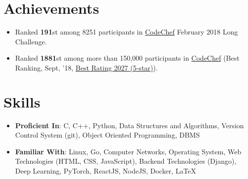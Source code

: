 \documentclass[a4paper,11pt]{article}
\newcommand{\resumeSubHeadingListStart}{\begin{itemize}[leftmargin=*, topsep=0pt]}
\newcommand{\resumeSubHeadingListEnd}{\end{itemize}}
\newcommand{\resumeItemListStart}{\begin{itemize}}
\newcommand{\resumeItemListEnd}{\end{itemize}\vspace{-5pt}}
\begin{document}
\section{Achievements}
    \resumeItemListStart
     \setlength{\itemsep}{0.5pt}
      \item
        {Ranked \textbf{191}st among 8251 participants in \href{https://www.codechef.com/rankings/FEB18?filterBy=Institution\%3DNational\%20Institute\%20of\%20Technology\%2C\%20Durgapur&order=asc&sortBy=rank}{CodeChef} February 2018 Long Challenge.}
      \item
        {Ranked \textbf{1881}st among more than 150,000 participants in \href{https://codechef.com/users/ayan_nitd}{CodeChef} (Best Ranking, Sept, '18, \href{https://www.codechef.com/users/ayan_nitd}{Best Rating 2027 (5-star)}).}
    \resumeItemListEnd

\section{Skills}
 \resumeSubHeadingListStart
    \setlength{\itemsep}{1pt}
     \item\textbf{Proficient In}{: C, C++, Python, Data Structures and Algorithms, Version Control System (git), Object Oriented Programming, DBMS}\\
     \item\textbf{Familiar With}{: Linux, Go, Computer Networks, Operating System, Web Technologies (HTML, CSS, JavaScript), Backend Technologies (Django), Deep Learning, PyTorch, ReactJS, NodeJS, Docker, \LaTeX}
 \resumeSubHeadingListEnd
 
\end{document}
